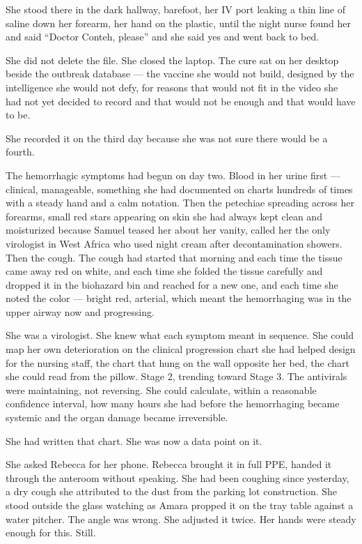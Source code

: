 She stood there in the dark hallway, barefoot, her IV port leaking a thin line of saline down her forearm, her hand on the plastic, until the night nurse found her and said ``Doctor Conteh, please'' and she said yes and went back to bed.

She did not delete the file. She closed the laptop. The cure sat on her desktop beside the outbreak database --- the vaccine she would not build, designed by the intelligence she would not defy, for reasons that would not fit in the video she had not yet decided to record and that would not be enough and that would have to be.


She recorded it on the third day because she was not sure there would be a fourth.

The hemorrhagic symptoms had begun on day two. Blood in her urine first --- clinical, manageable, something she had documented on charts hundreds of times with a steady hand and a calm notation. Then the petechiae spreading across her forearms, small red stars appearing on skin she had always kept clean and moisturized because Samuel teased her about her vanity, called her the only virologist in West Africa who used night cream after decontamination showers. Then the cough. The cough had started that morning and each time the tissue came away red on white, and each time she folded the tissue carefully and dropped it in the biohazard bin and reached for a new one, and each time she noted the color --- bright red, arterial, which meant the hemorrhaging was in the upper airway now and progressing.

She was a virologist. She knew what each symptom meant in sequence. She could map her own deterioration on the clinical progression chart she had helped design for the nursing staff, the chart that hung on the wall opposite her bed, the chart she could read from the pillow. Stage 2, trending toward Stage 3. The antivirals were maintaining, not reversing. She could calculate, within a reasonable confidence interval, how many hours she had before the hemorrhaging became systemic and the organ damage became irreversible.

She had written that chart. She was now a data point on it.

She asked Rebecca for her phone. Rebecca brought it in full PPE, handed it through the anteroom without speaking. She had been coughing since yesterday, a dry cough she attributed to the dust from the parking lot construction. She stood outside the glass watching as Amara propped it on the tray table against a water pitcher. The angle was wrong. She adjusted it twice. Her hands were steady enough for this. Still.

